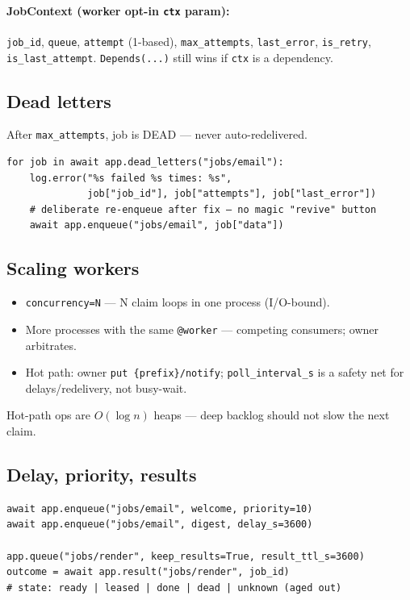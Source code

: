 \documentclass[11pt,a4paper]{article}
\begin{document}
\paragraph{JobContext (worker opt-in \texttt{ctx} param):}
\texttt{job\_id}, \texttt{queue}, \texttt{attempt} (1-based), \texttt{max\_attempts},
\texttt{last\_error}, \texttt{is\_retry}, \texttt{is\_last\_attempt}.
\texttt{Depends(...)} still wins if \texttt{ctx} is a dependency.

\subsection{Dead letters}

After \texttt{max\_attempts}, job is DEAD --- never auto-redelivered.

\begin{lstlisting}
for job in await app.dead_letters("jobs/email"):
    log.error("%s failed %s times: %s",
              job["job_id"], job["attempts"], job["last_error"])
    # deliberate re-enqueue after fix — no magic "revive" button
    await app.enqueue("jobs/email", job["data"])
\end{lstlisting}

\subsection{Scaling workers}

\begin{itemize}[leftmargin=*]
  \item \texttt{concurrency=N} --- N claim loops in one process (I/O-bound).
  \item More processes with the same \texttt{@worker} --- competing consumers;
        owner arbitrates.
  \item Hot path: owner \texttt{put \{prefix\}/notify}; \texttt{poll\_interval\_s}
        is a safety net for delays/redelivery, not busy-wait.
\end{itemize}

Hot-path ops are $O(\log n)$ heaps --- deep backlog should not slow the next claim.

\subsection{Delay, priority, results}

\begin{lstlisting}
await app.enqueue("jobs/email", welcome, priority=10)
await app.enqueue("jobs/email", digest, delay_s=3600)

app.queue("jobs/render", keep_results=True, result_ttl_s=3600)
outcome = await app.result("jobs/render", job_id)
# state: ready | leased | done | dead | unknown (aged out)
\end{lstlisting}
\end{document}
